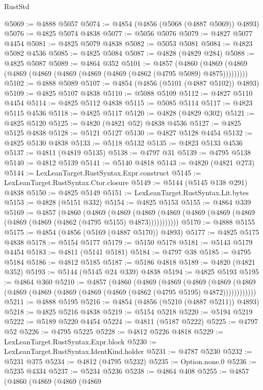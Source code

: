 \begin{lexlean}{RustStd}
\begin{coremodule}
{\begin{coremodule}
{{{{{{{{{{{{{{{{{{{{{{{{{{{{{{{{{{{{{{{{{{{{{{{{{{{{{{{{{{{{{{{{{{{{{{{{{{{{{{{{@5069 := @4888 @5057
@5074 := @4854 (@4856 (@5068 (@4887 @5069)) @4893)
@5076 := @4825 @5074 @4838
@5077 := @5056 @5076
@5079 := @4827 @5077 @4454
@5081 := @4825 @5079 @4838
@5082 := @5053 @5081
@5084 := @4823 @5082 @4536
@5085 := @4825 @5084
@5087 := @4828 (@4829 @284)
@5088 := @4825 @5087
@5089 := @4864 @352
@5101 := @4857
    (@4860 (@4869 (@4869 (@4869 (@4869 (@4869 (@4869 (@4869 (@4862 (@4795 @5089) @4875)))))))))
@5102 := @4888 @5089
@5107 := @4854 (@4856 (@5101 (@4887 @5102)) @4893)
@5109 := @4825 @5107 @4838
@5110 := @5088 @5109
@5112 := @4827 @5110 @4454
@5114 := @4825 @5112 @4838
@5115 := @5085 @5114
@5117 := @4823 @5115 @4536
@5118 := @4825 @5117
@5120 := @4828 (@4829 @302)
@5121 := @4825 @5120
@5125 := @4820 (@4821 @52) @4838 @4536
@5127 := @4825 @5125 @4838
@5128 := @5121 @5127
@5130 := @4827 @5128 @4454
@5132 := @4825 @5130 @4838
@5133 := @5118 @5132
@5135 := @4823 @5133 @4536
@5137 := @4811 (@4819 @5135)
@5138 := @4797 @31
@5139 := @4795 @5138
@5140 := @4812 @5139
@5141 := @5140 @4818
@5143 := @4820 (@4821 @273)
@5144 := LexLeanTarget.RustSyntax.Expr.construct
@5145 := LexLeanTarget.RustSyntax.Ctor.closure
@5149 := @5144 (@5145 @138 @291) @4838
@5150 := @4825 @5149
@5151 := LexLeanTarget.RustSyntax.Lit.bytes
@5153 := @4828 (@5151 @332)
@5154 := @4825 @5153
@5155 := @4864 @339
@5169 := @4857
    (@4860
      (@4869
        (@4869
          (@4869 (@4869 (@4869 (@4869 (@4869 (@4869 (@4869 (@4862 (@4795 @5155) @4873)))))))))))
@5170 := @4888 @5155
@5175 := @4854 (@4856 (@5169 (@4887 @5170)) @4893)
@5177 := @4825 @5175 @4838
@5178 := @5154 @5177
@5179 := @5150 @5178
@5181 := @5143 @5179 @4454
@5183 := @4811 (@5141 @5181)
@5184 := @4797 @38
@5185 := @4795 @5184
@5186 := @4812 @5185
@5187 := @5186 @4818
@5189 := @4820 (@4821 @352)
@5193 := @5144 (@5145 @24 @339) @4838
@5194 := @4825 @5193
@5195 := @4864 @360
@5210 := @4857
    (@4860
      (@4869
        (@4869
          (@4869
            (@4869 (@4869 (@4869 (@4869 (@4869 (@4869 (@4869 (@4862 (@4795 @5195) @4872))))))))))))
@5211 := @4888 @5195
@5216 := @4854 (@4856 (@5210 (@4887 @5211)) @4893)
@5218 := @4825 @5216 @4838
@5219 := @5154 @5218
@5220 := @5194 @5219
@5222 := @5189 @5220 @4454
@5224 := @4811 (@5187 @5222)
@5225 := @4797 @52
@5226 := @4795 @5225
@5228 := @4812 @5226 @4818
@5229 := LexLeanTarget.RustSyntax.Expr.block
@5230 := LexLeanTarget.RustSyntax.IdentKind.holder
@5231 := @4787 @5230
@5232 := @5231 @375
@5234 := @4812 (@4795 @5232)
@5235 := Option.none.{0}
@5236 := @5235 @4334
@5237 := @5234 @5236
@5238 := @4864 @408
@5255 := @4857
    (@4860
      (@4869
        (@4869
          (@4869
}}}}}}}}}}}}}}}}}}}}}}}}}}}}}}}}}}}}}}}}}}}}}}}}}}}}}}}}}}}}}}}}}}}}}}}}}}}}}}}}
\end{coremodule}}
\end{coremodule}
\end{lexlean}
